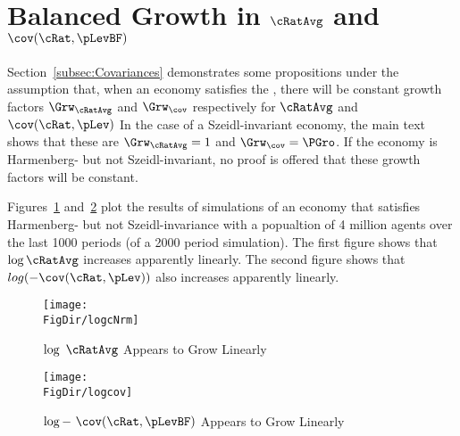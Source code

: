 \documentclass[\econtexRoot/BufferStockTheory]{subfiles}
\begin{document}
\hypertarget{ApndxBalancedGrowthCNrmAndCov}{}
\section{Balanced Growth in $\cRatAvg$ and $\cov(\cRat,\pLevBF)$}\label{sec:ApndxBalancedGrowthCNrmAndCov}


Section~\ref{subsec:Covariances} demonstrates some propositions under the assumption that, when an economy satisfies the {\GIC}, there will be constant growth factors $\Grw_{\cRatAvg}$ and $\Grw_{\cov}$ respectively for $\cRatAvg$ and $\cov(\cRat,\pLev)$  In the case of a Szeidl-invariant economy, the main text shows that these are $\Grw_{\cRatAvg}=1$ and $\Grw_{\cov}=\PGro$.  If the economy is Harmenberg- but not Szeidl-invariant, no proof is offered that these growth factors will be constant.

Figures~\ref{fig:logcNrm} and~\ref{fig:logcov} plot the results of simulations of an economy that satisfies Harmenberg- but not Szeidl-invariance with a popualtion of 4 million agents over the last 1000 periods (of a 2000 period simulation).  The first figure shows that $\log \cRatAvg$ increases apparently linearly.  The second figure shows that $log (-\cov(\cRat,\pLev))$ also increases apparently linearly.

\pagebreak
\begin{figure}[h]
  \centerline{
    \texttt{[image: \\FigDir/logcNrm]}
  }
  \caption{$\log ~\cRatAvg$ Appears to Grow Linearly}\label{fig:logcNrm}
\end{figure}
\begin{figure}[h]
  \centerline{
    \texttt{[image: \\FigDir/logcov]}
  }
  \caption{$\log -~\cov(\cRat,\pLevBF)$ Appears to Grow Linearly}\label{fig:logcov}
\end{figure}
\end{document}
